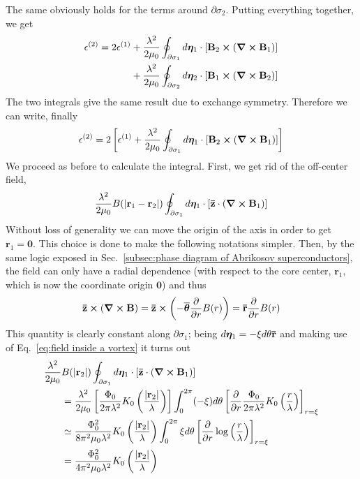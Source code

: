 The same obviously holds for the terms around $\partial\sigma_2$. Putting everything together, we get
\[
\begin{aligned}
	\epsilon^{(2)} = 2 \epsilon^{(1)} &+ \frac{\lambda^2}{2\mu_0} \oint_{\partial\sigma_1} d\bm\eta_1 \cdot \left[{ \mathbf{B}_2 \bm{\times} \left({\curl\mathbf{B}_1 }\right) }\right] \\
	&+ \frac{\lambda^2}{2\mu_0} \oint_{\partial\sigma_2} d\bm\eta_2 \cdot \left[{ \mathbf{B}_1 \bm{\times} \left({\curl\mathbf{B}_2 }\right) }\right]
\end{aligned}
\]
The two integrals give the same result due to exchange symmetry. Therefore we can write, finally
\[
	\epsilon^{(2)} = 2 \left[{ \epsilon^{(1)} + \frac{\lambda^2}{2\mu_0} \oint_{\partial\sigma_1} d\bm\eta_1 \cdot \left[{ \mathbf{B}_2 \bm{\times} \left({\curl\mathbf{B}_1 }\right) }\right] }\right]
\]
We proceed as before to calculate the integral. First, we get rid of the off-center field,
\[
	\frac{\lambda^2}{2\mu_0} B(\abs{\mathbf{r}_1-\mathbf{r}_2}) \oint_{\partial\sigma_1} d\bm\eta_1 \cdot \left[{ \mathbf{\bar{z}}\cdot \left({\curl\mathbf{B}_1 }\right) }\right]
\]
Without loss of generality we can move the origin of the axis in order to get $\mathbf{r}_1 = \mathbf{0}$. This choice is done to make the following notations simpler. Then, by the same logic exposed in Sec.~\ref{subsec:phase diagram of Abrikosov superconductors}, the field can only have a radial dependence (with respect to the core center, $\mathbf{r}_1$, which is now the coordinate origin $\mathbf{0}$) and thus
\[
	\mathbf{\bar{z}} \bm{\times} \left({\curl\mathbf{B}}\right) = \mathbf{\bar{z}} \bm\times \left({-\overline{\bm\theta} \pdv{}{r} B(r)}\right) = \mathbf{\bar{r}} \pdv{}{r} B(r)
\]
This quantity is clearly constant along $\partial\sigma_1$; being $d\bm\eta_1 = -\xi d\theta \mathbf{\bar{r}}$ and making use of Eq.~\eqref{eq:field inside a vortex} it turns out
\[
\begin{aligned}
	\frac{\lambda^2}{2\mu_0} &B(\abs{\mathbf{r}_2}) \oint_{\partial\sigma_1} d\bm\eta_1 \cdot \left[{ \mathbf{\bar{z}}\cdot \left({\curl\mathbf{B}_1 }\right) }\right] \\
	&= \frac{\lambda^2}{2\mu_0} \left[{ \frac{\Phi_0}{2\pi\lambda^2} K_0 \left({\frac{\abs{\mathbf{r}_2}}{\lambda}}\right) }\right] \int_0^{2\pi} (-\xi) d\theta \left[{\pdv{}{r} \frac{\Phi_0}{2\pi\lambda^2} K_0 \left({\frac{r}{\lambda}}\right) }\right]_{r=\xi} \\
	&\simeq \frac{\Phi_0^2}{8\pi^2\mu_0 \lambda^2} K_0 \left({\frac{\abs{\mathbf{r}_2}}{\lambda}}\right) \int_0^{2\pi} \xi d\theta \left[{\pdv{}{r} \log\left({\frac{r}{\lambda}}\right) }\right]_{r=\xi} \\
	&= \frac{\Phi_0^2}{4\pi^2\mu_0 \lambda^2} K_0 \left({\frac{\abs{\mathbf{r}_2}}{\lambda}}\right)
\end{aligned}
\]
